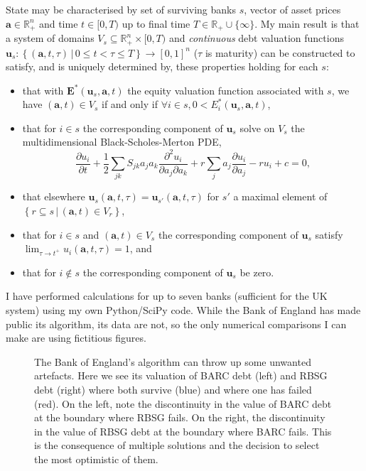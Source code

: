 \documentclass[11pt, a4paper]{article}
\newcommand{\va}{\boldsymbol{a}}
\newcommand{\vu}{\boldsymbol{u}}
\newcommand{\vE}{\boldsymbol{E}}
\begin{document}
\vspace{1\baselineskip}\noindent
State may be characterised
by set of surviving banks $s$, vector of asset prices
$\va\in \mathbb{R}_{+}^{n}$ and time $t\in[0,T)$ up to final time $T\in\mathbb{R}_{+}\cup\{\infty\}$.
My main result is that a system of domains
$V_{s}\subseteq\mathbb{R}_{+}^{n}\times [0,T)$ and \emph{continuous} debt valuation functions
$\vu_{s}:\left\{(\va,t,\tau)\,\vert\, 0\leq t<\tau\leq T\right\}\to [0,1]^{n}$
($\tau$ is maturity) can be constructed to satisfy, and is uniquely determined by,
these properties holding for each $s$:
\begin{itemize}
\item
  that with $\vE^{*}(\vu_{s},\va,t)$ the
  equity valuation function associated with $s$, we have
\(
  (\va,t)\in V_{s} \) if and only if \(\forall i \in s, 0<E^{*}_{i}(\vu_{s},\va,t)
\),
  \item
that for $i\in s$ the corresponding component of $\vu_{s}$
solve on \(V_{s}\) the multidimensional Black-Scholes-Merton PDE,
\begin{equation*}
  \frac{\partial u_{i}}{\partial t} +
  \frac{1}{2}\sum_{jk} S_{jk}a_{j}a_{k}\frac{\partial^{2} u_{i}}{\partial
    a_{j}\partial a_{k}}
  +r\sum_{j}a_{j}\frac{\partial{u_{i}}}{\partial{a_{j}}}-ru_{i}+c
  =0,
\end{equation*}
\item
  that elsewhere \( \vu_{s}(\va,t,\tau)=\vu_{s'}(\va,t,\tau) \) for $s'$ a maximal element
  of $\left\{r\subseteq s\,\vert\, (\va,t)\in
      V_{r}\right\}$,
\item
  that for $i\in s$ and $(\va,t)\in V_{s}$ the corresponding component of $\vu_{s}$ satisfy
\(
  \lim_{\tau\to t^{+}}u_{i}(\va,t,\tau)=1
\), and
\item
  that for $i\notin s$ the corresponding component of \(\vu_{s}\)
  be zero.
\end{itemize}
I have performed calculations for up to seven banks (sufficient for the
UK system) using my own Python/SciPy code.
While the Bank of England has made public its algorithm, its data are not, so
the only numerical comparisons I can make are using fictitious
figures.

\begin{figure}[!t]
  \centering
  
  
  \caption{The Bank of England's algorithm can throw up some unwanted artefacts. Here
    we see its valuation of BARC debt (left) and RBSG debt (right) where both survive
    (blue) and where one has failed (red). On the left, note the
    discontinuity in the value of BARC debt at the boundary where RBSG fails. On
    the right, the discontinuity in the value of RBSG debt at
    the boundary where BARC fails.
    This is the consequence of multiple solutions and the decision to
    select the most optimistic of them.}
  \label{fig:discontinuities}
\end{figure}
\end{document}
